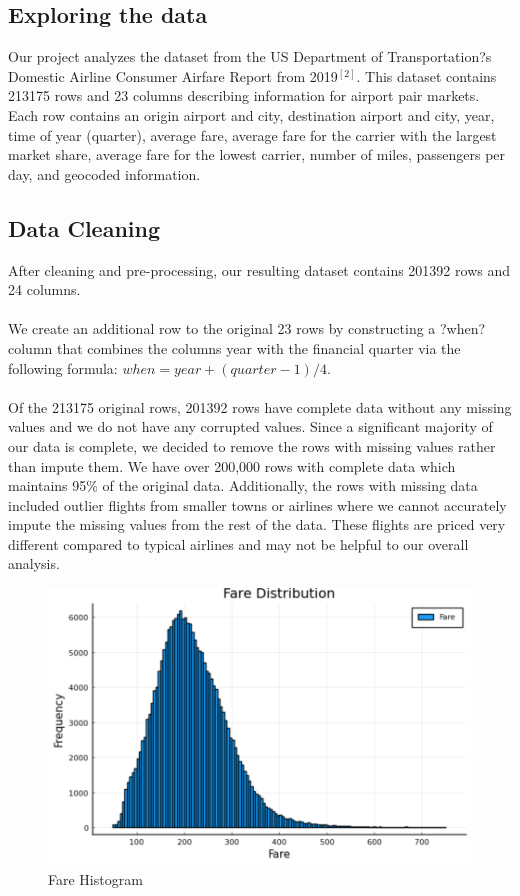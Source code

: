 \documentclass{article}
\begin{document}
\subsection{Exploring the data}

Our project analyzes the dataset from the US Department of Transportation?s Domestic Airline Consumer Airfare Report from 2019$^{[2]}$. This dataset contains 213175 rows and 23 columns describing information for airport pair markets. Each row contains an origin airport and city, destination airport and city, year, time of year (quarter), average fare, average fare for the carrier with the largest market share, average fare for the lowest carrier, number of miles, passengers per day, and geocoded information.

\subsection{Data Cleaning}
After cleaning and pre-processing, our resulting dataset contains 201392 rows and 24 columns.\\\\
We create an additional row to the original 23 rows by constructing a ?when? column that combines the columns year with the financial quarter via the following formula: $when = year + (quarter - 1)/4$. \\\\
Of the 213175 original rows, 201392 rows have complete data without any missing values and we do not have any corrupted values. Since a significant majority of our data is complete, we decided to remove the rows with missing values rather than impute them. We have over 200,000 rows with complete data which maintains 95\% of the original data. Additionally, the rows with missing data included outlier flights from smaller towns or airlines where we cannot accurately impute the missing values from the rest of the data. These flights are priced very different compared to typical airlines and may not be helpful to our overall analysis.

 \begin{figure}[h]
\centering
\includegraphics[scale=.5]{images/hist_plot.png}
\caption{Fare Histogram}
\end{figure}
\end{document}
